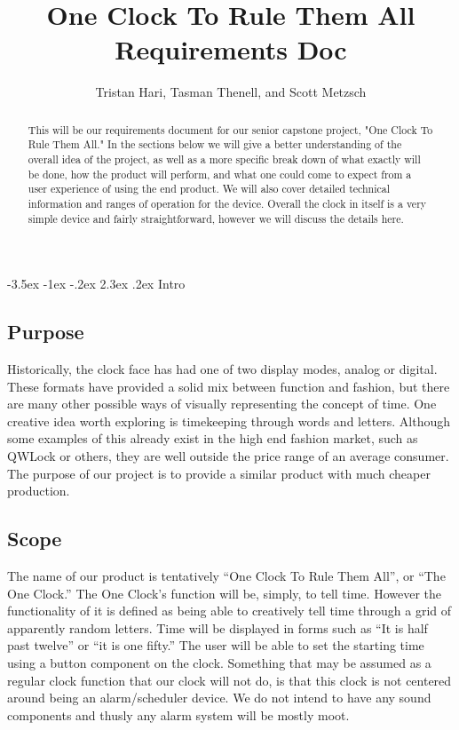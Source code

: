\documentclass[10pt,draftclsnofoot,onecolumn]{IEEEtran}
\makeatletter
\renewcommand\section{\@startsection {section}{1}{\z@}%
                                   {-3.5ex \@plus -1ex \@minus -.2ex}%
                                   {2.3ex \@plus.2ex}%
                                   {\normalfont\LARGE\bfseries}}%
\makeatother
\begin{document}
\title{One Clock To Rule Them All Requirements Doc}
\author{Tristan Hari, Tasman Thenell, and Scott Metzsch}
\maketitle
\begin{abstract}
This will be our requirements document for our senior capstone project, "One Clock To Rule Them All."
In the sections below we will give a better understanding of the overall idea of the project, as
well as a more specific break down of what exactly will be done, how the product will perform,
and what one could come to expect from a user experience of using the end product. We will also
cover detailed technical information and ranges of operation for the device. Overall the clock in
itself is a very simple device and fairly straightforward, however we will discuss the details here.
\end{abstract}
\IEEEpeerreviewmaketitle

\newpage
\tableofcontents
\newpage


\section{Intro}
\subsection{Purpose}
Historically, the clock face has had one of two display modes, analog or digital.
These formats have provided a solid mix between function and fashion, but there are many
other possible ways of visually representing the concept of time. One creative idea worth
exploring is timekeeping through words and letters. Although some examples of this already
exist in the high end fashion market, such as QWLock or others, they are well outside the
price range of an average consumer. The purpose of our project is to provide a similar
product with much cheaper production.

\subsection{Scope}
The name of our product is tentatively “One Clock To Rule Them All”, or “The One Clock.”
The One Clock’s function will be, simply, to tell time. However the functionality of it is
defined as being able to creatively tell time through a grid of apparently random letters.
Time will be displayed in forms such as “It is half past twelve” or “it is one fifty.” The
user will be able to set the starting time using a button component on the clock. Something
that may be assumed as a regular clock function that our clock will not do, is that this clock
 is not centered around being an alarm/scheduler device. We do not intend to have any sound
 components and thusly any alarm system will be mostly moot.
\end{document}
